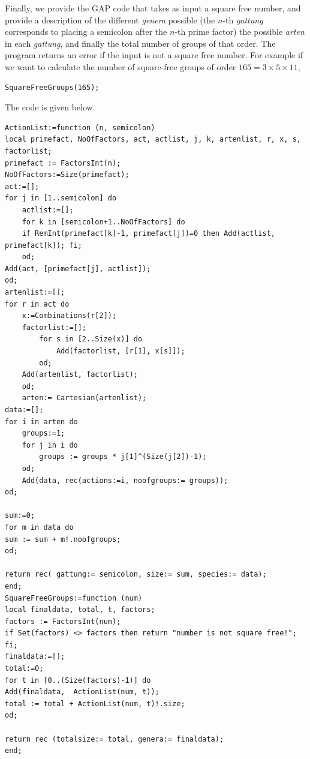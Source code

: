 \documentclass[11pt]{book}
\theoremstyle{Rem}
\theoremstyle{definition}
\numberwithin{equation}{section}
\begin{document}
Finally, we provide the GAP code that takes as input a square free number, and provide a description of the different \textit{genera} possible (the $n$-th \textit{gattung} corresponds to placing a semicolon after the $n$-th prime factor) the possible \textit{arten} in each \textit{gattung}, and finally the total number of groups of that order. The program returns an error if the input is not a square free number.
For example if we want to calculate the number of square-free groups of order $165 = 3\times 5 \times 11$,
\begin{lstlisting}
SquareFreeGroups(165);
\end{lstlisting}
The code is given below. 
\begin{lstlisting}
ActionList:=function (n, semicolon)
local primefact, NoOfFactors, act, actlist, j, k, artenlist, r, x, s, factorlist;
primefact := FactorsInt(n);
NoOfFactors:=Size(primefact);
act:=[];
for j in [1..semicolon] do
	actlist:=[];
	for k in [semicolon+1..NoOfFactors] do
	if RemInt(primefact[k]-1, primefact[j])=0 then Add(actlist, primefact[k]); fi;
	od;
Add(act, [primefact[j], actlist]);
od;
artenlist:=[];
for r in act do
	x:=Combinations(r[2]);
	factorlist:=[];
		for s in [2..Size(x)] do
			Add(factorlist, [r[1], x[s]]);
		od;
	Add(artenlist, factorlist);
	od; 
	arten:= Cartesian(artenlist);
data:=[];
for i in arten do
	groups:=1;
	for j in i do
		groups := groups * j[1]^(Size(j[2])-1);
	od;
	Add(data, rec(actions:=i, noofgroups:= groups));
od;

sum:=0;
for m in data do
sum := sum + m!.noofgroups;
od;

return rec( gattung:= semicolon, size:= sum, species:= data);	 
end;
SquareFreeGroups:=function (num)
local finaldata, total, t, factors;
factors := FactorsInt(num);
if Set(factors) <> factors then return "number is not square free!"; fi;
finaldata:=[];
total:=0;
for t in [0..(Size(factors)-1)] do
Add(finaldata,  ActionList(num, t));
total := total + ActionList(num, t)!.size;
od;

return rec (totalsize:= total, genera:= finaldata);
end;
\end{lstlisting}
\end{document}
